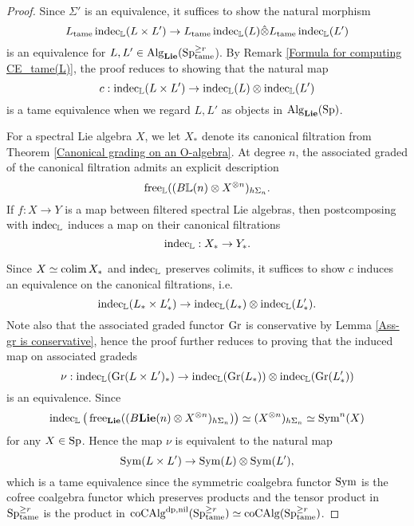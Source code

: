 \begin{proof}
    Since $\Sigma'$ is an equivalence, it suffices to show
	the natural morphism 
	\[
	L_{\operatorname{\operatorname{tame}}}\operatorname{indec}_{{\mathbb{L}}}(L \times L') 
	\to 
	L_{\operatorname{\operatorname{tame}}}\operatorname{indec}_{{\mathbb{L}}}(L)\hat{\otimes} 
	L_{\operatorname{\operatorname{tame}}}\operatorname{indec}_{{\mathbb{L}}}(L') 
	\]
	is an equivalence for $L,L' \in \operatorname{Alg}_{\mathbf{Lie}}(\operatorname{Sp}^{\geq r}_{\operatorname{\operatorname{tame}}}$). 
	By Remark \ref{Formula for computing CE_tame(L)}, the proof reduces to showing that the natural map 
	\[
    c:	\operatorname{indec}_{{\mathbb{L}}}(L \times L') 
	\to 
	\operatorname{indec}_{{\mathbb{L}}}(L)\otimes \operatorname{indec}_{{\mathbb{L}}}(L') 
	\]
	is a tame equivalence when we regard $L,L'$ as objects in $\operatorname{Alg}_{\mathbf{Lie}}(\operatorname{Sp})$.

	For a spectral Lie algebra $X$, we let $X_*$ denote its canonical filtration from Theorem \ref{Canonical grading on an O-algebra}. At degree $n$,
	the associated graded of the canonical filtration admits an explicit description 
	$$
	\operatorname{free}_{{\mathbb{L}}}((B{\mathbb{L}}(n)\otimes X^{\otimes n})_{h\Sigma_n}.
	$$
	If $f: X \to Y $ is a map between filtered spectral Lie algebras, then
	postcomposing with $\operatorname{indec}_{{\mathbb{L}}}$ induces a map on their canonical filtrations
	$$
	\operatorname{indec}_{{\mathbb{L}}}: X_* \to Y_*. 
	$$
	
	Since $X\simeq \operatorname{colim} X_*$ and $\operatorname{indec}_{{\mathbb{L}}}$ preserves colimits, it suffices to show $c$ induces an equivalence on the canonical filtrations, i.e.
	$$
	\operatorname{indec}_{{\mathbb{L}}}(L_* \times L'_*)
	\to 
	\operatorname{indec}_{{\mathbb{L}}}(L_*) \otimes \operatorname{indec}_{{\mathbb{L}}}(L'_*).
	$$
	Note also that the associated graded functor $\operatorname{\operatorname{Gr}}$ is conservative by Lemma \ref{Ass-gr is conservative}, hence the proof further reduces to proving that the induced map on associated gradeds
    \[
    \nu:
	\operatorname{indec}_{{\mathbb{L}}}( \operatorname{\operatorname{Gr}}(L \times L')_{*} )
	\to 
	\operatorname{indec}_{{\mathbb{L}}}(\operatorname{\operatorname{Gr}}(L_*))\otimes \operatorname{indec}_{{\mathbb{L}}}(\operatorname{\operatorname{Gr}}(L'_*))
	\]
	is an equivalence.
	Since
	$$
	\operatorname{indec}_{{\mathbb{L}}}\big(
	\operatorname{free}_{\mathbf{Lie}}((B\mathbf{Lie}(n)\otimes X^{\otimes n})_{h\Sigma_n} )
	\big)
	\simeq 
	(X^{\otimes n})_{h\Sigma_n}
	\simeq
	\operatorname{Sym}^n(X)
	$$
	for any $X\in \operatorname{Sp}$.
	Hence the map $\nu$ is equivalent to the natural map
	$$
	\operatorname{Sym} (L\times L') \to \operatorname{Sym}(L) \otimes \operatorname{Sym}(L'),
	$$
	which is a tame equivalence since the symmetric coalgebra functor $\operatorname{Sym}$ is the cofree coalgebra functor which preserves products and the tensor product in $\operatorname{Sp}^{\geq r}_{\operatorname{\operatorname{tame}}}$ is the product in $\operatorname{coCAlg}^{\operatorname{dp},\operatorname{nil}}(\operatorname{Sp}^{\geq r}_{\operatorname{\operatorname{tame}}})\simeq \operatorname{coCAlg}(\operatorname{Sp}^{\geq r}_{\operatorname{\operatorname{tame}}})$.

\end{proof}













